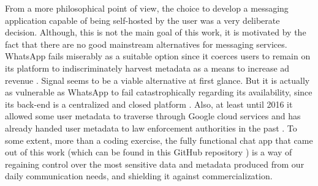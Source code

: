From a more philosophical point of view, the choice to develop a messaging application capable of being self-hosted by the user was a very deliberate decision. Although, this is not the main goal of this work, it is motivated by the fact that there are no good mainstream alternatives for messaging services. WhatsApp fails miserably as a suitable option since it coerces users to remain on its platform to indiscriminately harvest metadata as a means to increase ad revenue \cite{Kumar2021}. Signal seems to be a viable alternative at first glance. But it is actually as vulnerable as WhatsApp to fail catastrophically regarding its availability, since its back-end is a centralized and closed platform \cite{Hodgson2020}. Also, at least until 2016 it allowed some user metadata to traverse through Google cloud services \cite{Edge2016} and has already handed user metadata to law enforcement authorities in the past \cite{Kaufman2016}. To some extent, more than a coding exercise, the fully functional chat app that came out of this work (which can be found in this GitHub repository \cite{Rodriguez2022}) is a way of regaining control over the most sensitive data and metadata produced from our daily communication needs, and shielding it against commercialization.